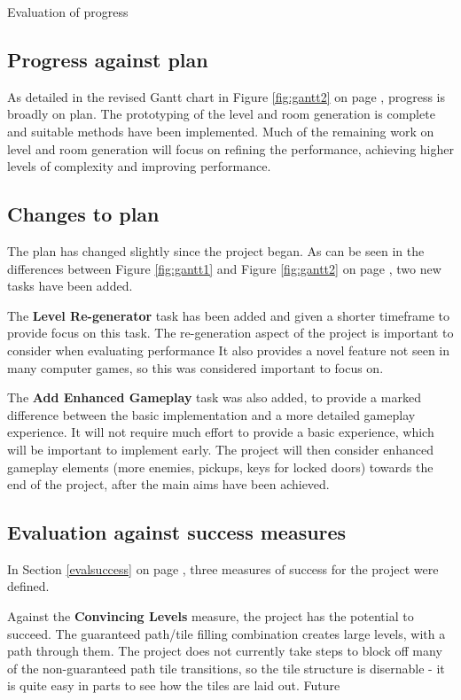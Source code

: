 \documentclass[progress]{cmpreport}
\begin{document}
\begin{section}{Evaluation of progress}

\subsection{Progress against plan}
As detailed in the revised Gantt chart in Figure \ref{fig:gantt2} on page \pageref{fig:gantt2}, progress is broadly on plan. The prototyping of the level and room generation is complete and suitable methods have been implemented. Much of the remaining work on level and room generation will focus on refining the performance, achieving higher levels of complexity and improving performance.

\subsection{Changes to plan}
The plan has changed slightly since the project began. As can be seen in the differences between Figure \ref{fig:gantt1} and Figure \ref{fig:gantt2} on page \pageref{fig:gantt2}, two new tasks have been added.

The \textbf{Level Re-generator} task has been added and given a shorter timeframe to provide focus on this task. The re-generation aspect of the project is important to consider when evaluating performance It also provides a novel feature not seen in many computer games, so this was considered important to focus on.

The \textbf{Add Enhanced Gameplay} task was also added, to provide a marked difference between the basic implementation and a more detailed gameplay experience. It will not require much effort to provide a basic experience, which will be important to implement early. The project will then consider enhanced gameplay elements (more enemies, pickups, keys for locked doors) towards the end of the project, after the main aims have been achieved.

\subsection{Evaluation against success measures}
In Section \ref{evalsuccess} on page \pageref{evalsuccess}, three measures of success for the project were defined. 

Against the \textbf{Convincing Levels} measure, the project has the potential to succeed. The guaranteed path/tile filling combination creates large levels, with a path through them. The project does not currently take steps to block off many of the non-guaranteed path tile transitions, so the tile structure is disernable - it is quite easy in parts to see how the tiles are laid out. Future 


\end{section}
\end{document}
